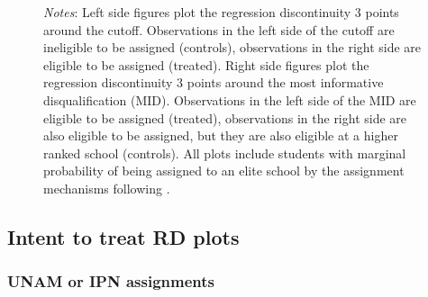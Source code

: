 \documentclass[oneside,11pt]{article}
\begin{document}
\begin{figure}[H]
\footnotesize
\textit{Notes}: Left side figures plot the regression discontinuity 3 points around the cutoff. Observations in the left side of the cutoff are ineligible to be assigned (controls), observations in the right side are eligible to be assigned (treated). Right side figures plot the regression discontinuity 3 points around the most informative disqualification (MID). Observations in the left side of the MID are eligible to be assigned (treated), observations in the right side are also eligible to be assigned, but they are also eligible at a higher ranked school (controls). All plots include students with marginal probability of being assigned to an elite school by the assignment mechanisms following \citet{abdulkadirouglu2022breaking}. 
\end{figure}


\subsection{Intent to treat RD plots}

\subsubsection{UNAM or IPN assignments}
\end{document}
